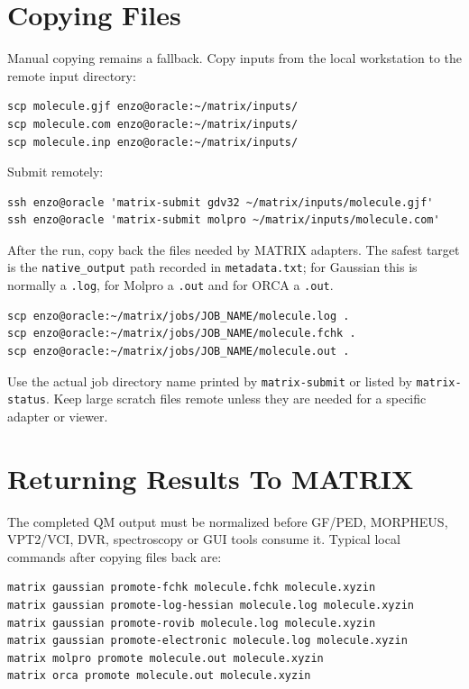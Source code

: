 \documentclass[11pt]{article}
\begin{document}
\section{Copying Files}

Manual copying remains a fallback.  Copy inputs from the local workstation to
the remote input directory:

\begin{lstlisting}[style=matrix]
scp molecule.gjf enzo@oracle:~/matrix/inputs/
scp molecule.com enzo@oracle:~/matrix/inputs/
scp molecule.inp enzo@oracle:~/matrix/inputs/
\end{lstlisting}

Submit remotely:

\begin{lstlisting}[style=matrix]
ssh enzo@oracle 'matrix-submit gdv32 ~/matrix/inputs/molecule.gjf'
ssh enzo@oracle 'matrix-submit molpro ~/matrix/inputs/molecule.com'
\end{lstlisting}

After the run, copy back the files needed by MATRIX adapters.  The safest
target is the \texttt{native\_output} path recorded in
\texttt{metadata.txt}; for Gaussian this is normally a \texttt{.log}, for
Molpro a \texttt{.out} and for ORCA a \texttt{.out}.

\begin{lstlisting}[style=matrix]
scp enzo@oracle:~/matrix/jobs/JOB_NAME/molecule.log .
scp enzo@oracle:~/matrix/jobs/JOB_NAME/molecule.fchk .
scp enzo@oracle:~/matrix/jobs/JOB_NAME/molecule.out .
\end{lstlisting}

Use the actual job directory name printed by \texttt{matrix-submit} or listed
by \texttt{matrix-status}.  Keep large scratch files remote unless they are
needed for a specific adapter or viewer.

\section{Returning Results To MATRIX}

The completed QM output must be normalized before GF/PED, MORPHEUS,
VPT2/VCI, DVR, spectroscopy or GUI tools consume it.  Typical local commands
after copying files back are:

\begin{lstlisting}[style=matrix]
matrix gaussian promote-fchk molecule.fchk molecule.xyzin
matrix gaussian promote-log-hessian molecule.log molecule.xyzin
matrix gaussian promote-rovib molecule.log molecule.xyzin
matrix gaussian promote-electronic molecule.log molecule.xyzin
matrix molpro promote molecule.out molecule.xyzin
matrix orca promote molecule.out molecule.xyzin
\end{lstlisting}
\end{document}
